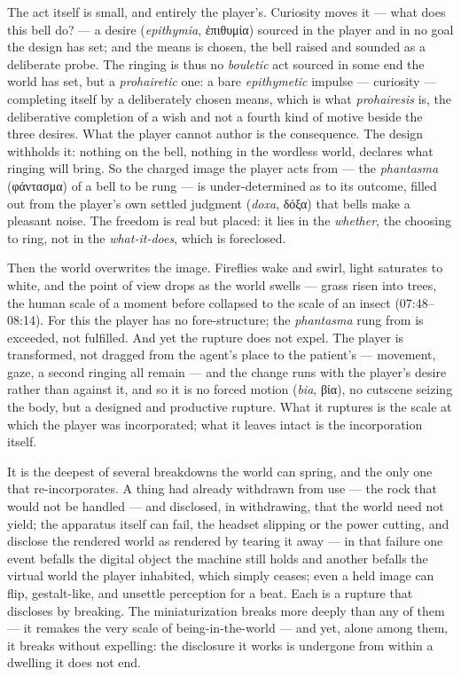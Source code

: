 \documentclass{article}
\newcommand{\gk}[1]{{\greekfont #1}}
\begin{document}
The act itself is small, and entirely the player's. Curiosity moves it — what does this bell do? — a desire (\textit{epithymia}, \gk{ἐπιθυμία}) sourced in the player and in no goal the design has set; and the means is chosen, the bell raised and sounded as a deliberate probe. The ringing is thus no \textit{bouletic} act sourced in some end the world has set, but a \textit{prohairetic} one: a bare \textit{epithymetic} impulse — curiosity — completing itself by a deliberately chosen means, which is what \textit{prohairesis} is, the deliberative completion of a wish and not a fourth kind of motive beside the three desires. What the player cannot author is the consequence. The design withholds it: nothing on the bell, nothing in the wordless world, declares what ringing will bring. So the charged image the player acts from — the \textit{phantasma} (\gk{φάντασμα}) of a bell to be rung — is under-determined as to its outcome, filled out from the player's own settled judgment (\textit{doxa}, \gk{δόξα}) that bells make a pleasant noise. The freedom is real but placed: it lies in the \textit{whether}, the choosing to ring, not in the \textit{what-it-does}, which is foreclosed.

Then the world overwrites the image. Fireflies wake and swirl, light saturates to white, and the point of view drops as the world swells — grass risen into trees, the human scale of a moment before collapsed to the scale of an insect (07:48–08:14). For this the player has no fore-structure; the \textit{phantasma} rung from is exceeded, not fulfilled. And yet the rupture does not expel. The player is transformed, not dragged from the agent's place to the patient's — movement, gaze, a second ringing all remain — and the change runs with the player's desire rather than against it, and so it is no forced motion (\textit{bia}, \gk{βία}), no cutscene seizing the body, but a designed and productive rupture. What it ruptures is the scale at which the player was incorporated; what it leaves intact is the incorporation itself.

It is the deepest of several breakdowns the world can spring, and the only one that re-incorporates. A thing had already withdrawn from use — the rock that would not be handled — and disclosed, in withdrawing, that the world need not yield; the apparatus itself can fail, the headset slipping or the power cutting, and disclose the rendered world as rendered by tearing it away — in that failure one event befalls the digital object the machine still holds and another befalls the virtual world the player inhabited, which simply ceases; even a held image can flip, gestalt-like, and unsettle perception for a beat. Each is a rupture that discloses by breaking. The miniaturization breaks more deeply than any of them — it remakes the very scale of being-in-the-world — and yet, alone among them, it breaks without expelling: the disclosure it works is undergone from within a dwelling it does not end.
\end{document}
